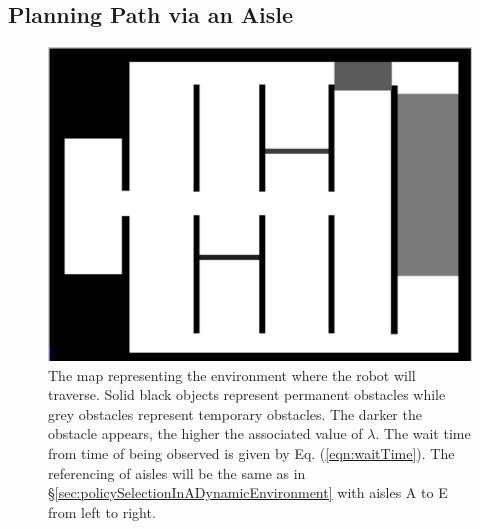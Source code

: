 \documentclass[a4paper,12pt]{article}
\begin{document}
		\subsection{Planning Path via an Aisle}
		\label{sec:planningPathViaAisleROS}
		
		\begin{figure}[H]
			\centering
			\includegraphics[width=.5\textwidth]{images/stdr_map.png}
			\caption{The map representing the environment where the robot will traverse. Solid black objects represent permanent obstacles while grey obstacles represent temporary obstacles. The darker the obstacle appears, the higher the associated value of $\lambda$. The wait time from time of being observed is given by Eq. (\ref{eqn:waitTime}). The referencing of aisles will be the same as in \S \ref{sec:policySelectionInADynamicEnvironment} with aisles A to E from left to right.}
			\label{fig:stdrMap}
		\end{figure}
		
\end{document}
